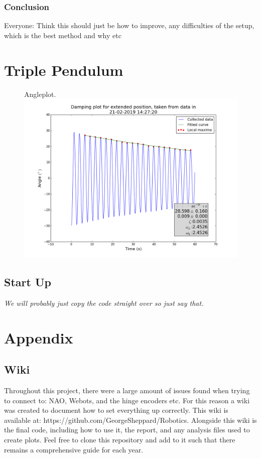 \documentclass[11pt]{article}
\newcommand*\ruleline[1]{\par\noindent\raisebox{.8ex}{\makebox[\linewidth]{\hrulefill\hspace{1ex}\raisebox{-.8ex}{#1}\hspace{1ex}\hrulefill}}}
\begin{document}
\subsubsection{Conclusion}
Everyone: Think this should just be how to improve, any difficulties of the setup, which is the best method and why etc

\section{Triple Pendulum}

    \begin{figure}[!htb]
        \centering
        \captionbox
             {Angleplot.\label{angleplot}}
             {\includegraphics[width=1.0\textwidth]{ExtendedPositionDamping.png}}
    \end{figure}

\subsection{Start Up}
\textit{We will probably just copy the code straight over so just say that.}


\appendix
\section{Appendix}
\subsection{Wiki} \label{sec:wiki}
\ruleline{George Sheppard}
Throughout this project, there were a large amount of issues found when trying to connect to: NAO, Webots, and the hinge encoders etc. For this reason a wiki was created to document how to set everything up correctly. This wiki is available at: https://github.com/GeorgeSheppard/Robotics. Alongside this wiki is the final code, including how to use it, the report, and any analysis files used to create plots. Feel free to clone this repository and add to it such that there remains a comprehensive guide for each year.
\end{document}
